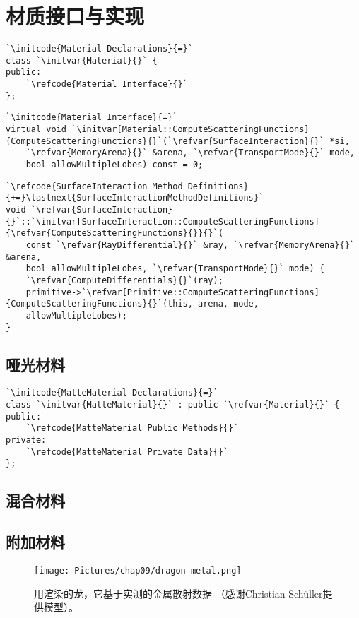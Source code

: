 \section{材质接口与实现}\label{sec:材质接口与实现}

\begin{lstlisting}
`\initcode{Material Declarations}{=}`
class `\initvar{Material}{}` {
public:
    `\refcode{Material Interface}{}`
};
\end{lstlisting}

\begin{lstlisting}
`\initcode{Material Interface}{=}`
virtual void `\initvar[Material::ComputeScatteringFunctions]{ComputeScatteringFunctions}{}`(`\refvar{SurfaceInteraction}{}` *si,
    `\refvar{MemoryArena}{}` &arena, `\refvar{TransportMode}{}` mode,
    bool allowMultipleLobes) const = 0;
\end{lstlisting}

\begin{lstlisting}
`\refcode{SurfaceInteraction Method Definitions}{+=}\lastnext{SurfaceInteractionMethodDefinitions}`
void `\refvar{SurfaceInteraction}{}`::`\initvar[SurfaceInteraction::ComputeScatteringFunctions]{\refvar{ComputeScatteringFunctions}{}}{}`(
    const `\refvar{RayDifferential}{}` &ray, `\refvar{MemoryArena}{}` &arena,
    bool allowMultipleLobes, `\refvar{TransportMode}{}` mode) {
    `\refvar{ComputeDifferentials}{}`(ray);
    primitive->`\refvar[Primitive::ComputeScatteringFunctions]{ComputeScatteringFunctions}{}`(this, arena, mode,
    allowMultipleLobes);
}
\end{lstlisting}

\subsection{哑光材料}\label{sub:哑光材料}
\begin{lstlisting}
`\initcode{MatteMaterial Declarations}{=}`
class `\initvar{MatteMaterial}{}` : public `\refvar{Material}{}` {
public:
    `\refcode{MatteMaterial Public Methods}{}`
private:
    `\refcode{MatteMaterial Private Data}{}`
};
\end{lstlisting}

\subsection{混合材料}\label{sub:混合材料}
\subsection{附加材料}\label{sub:附加材料}
\begin{figure}[htbp]
    \centering
    \texttt{[image: Pictures/chap09/dragon-metal.png]}
    \caption{用渲染的龙，它基于实测的金属散射数据
        （感谢Christian Schüller提供模型）。}
    \label{fig:9.4}
\end{figure}